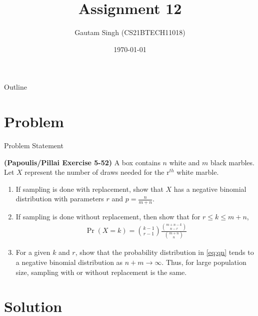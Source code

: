 \documentclass{beamer}
\title{Assignment 12}
\author{Gautam Singh (CS21BTECH11018)}
\date{\today}
\providecommand{\pr}[1]{\ensuremath{\Pr\left(#1\right)}}
\begin{document}
\begin{frame}
    \titlepage 
\end{frame}

\begin{frame}{Outline}
    \tableofcontents
\end{frame}


\section{Problem}
\begin{frame}{Problem Statement}

\textbf{(Papoulis/Pillai Exercise 5-52)}  A box contains $n$ white and $m$ black marbles. Let $X$ represent the number of draws needed for the r$^{th}$ white marble.
\begin{enumerate}
	\item If sampling is done with replacement, show that $X$ has a negative binomial distribution with parameters $r$ and $p = \frac{n}{m + n}$.
	\item If sampling is done without replacement, then show that for $r \leq k \leq m + n$,
		\begin{align}
			\pr{X = k} = \binom{k - 1}{r - 1}\frac{\binom{m + n - k}{n - r}}{\binom{m + n}{n}}
			\label{eq:qn}
		\end{align}
	\item For a given $k$ and $r$, show that the probability distribution in \eqref{eq:qn} tends to a negative binomial distribution as $n + m \to \infty$. Thus, for large population size, sampling with or without replacement is the same.
\end{enumerate}
\end{frame}


\section{Solution}
\end{document}

